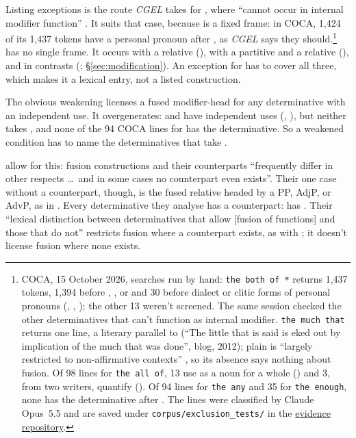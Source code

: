 \documentclass[12pt]{article}
\begin{document}
Listing exceptions is the route \textit{CGEL} takes for , where  \enquote{cannot occur in internal modifier function} \citep[377]{huddleston2002}. It suits that case, because  is a fixed frame: in COCA, 1,424 of its 1,437 tokens have a personal pronoun after , as \textit{CGEL} says they should.\footnote{COCA, 15 October 2026, searches run by hand: \texttt{the both of *} returns 1,437 tokens, 1,394 before , , or  and 30 before dialect or clitic forms of personal pronouns (, , ); the other 13 weren't screened. The same session checked the other determinatives that can't function as internal modifier. \texttt{the much that} returns one line, a literary parallel to  (\enquote{The little that is said is eked out by implication of the much that was done}, blog, 2012); plain  is \enquote{largely restricted to non-affirmative contexts} \citep[393]{huddleston2002}, so its absence says nothing about fusion. Of 98 lines for \texttt{the all of}, 13 use  as a noun for a whole () and 3, from two writers, quantify (). Of 94 lines for \texttt{the any} and 35 for \texttt{the enough}, none has the determinative after . The lines were classified by Claude Opus~5.5 and are saved under \texttt{corpus/exclusion\_tests/} in the \href{https://github.com/BrettRey/determinatives-as-nouns}{evidence repository}.}  has no single frame. It occurs with a relative (), with a partitive and a relative (), and in contrasts (; §\ref{sec:modification}). An exception for  has to cover all three, which makes it a lexical entry, not a listed construction.

The obvious weakening licenses a fused modifier-head for any determinative with an independent use. It overgenerates:  and  have independent uses (, ), but neither takes , and none of the 94 COCA lines for  has the determinative. So a weakened condition has to name the determinatives that take .

\textcite[570]{Payne2007} allow for this: fusion constructions and their counterparts \enquote{frequently differ in other respects \ldots\ and in some cases no counterpart even exists}. Their one case without a counterpart, though, is the fused relative headed by a PP, AdjP, or AdvP, as in  \citep[575]{Payne2007}. Every determinative they analyse has a counterpart:  has  \citep[588]{Payne2007}. Their \enquote{lexical distinction between determinatives that allow [fusion of functions] and those that do not} \citep[581]{Payne2007} restricts fusion where a counterpart exists, as with ; it doesn't license fusion where none exists.
\end{document}
